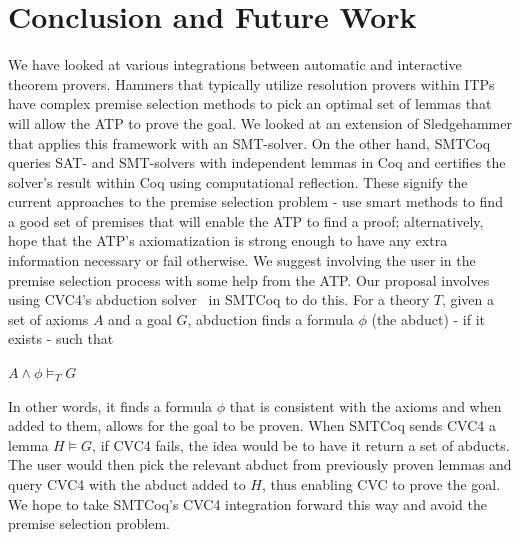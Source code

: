 \documentclass{article}
\begin{document}
\section{Conclusion and Future Work}
\label{sec:conc}
	We have looked at various integrations between 
	automatic and interactive theorem provers.
	Hammers that typically utilize resolution 
	provers within ITPs have complex premise 
	selection methods to pick an optimal set 
	of lemmas that will allow the ATP to prove 
	the goal. We looked at an extension of 
	Sledgehammer that applies this framework 
	with an SMT-solver. On the other hand, 
	SMTCoq queries SAT- and SMT-solvers with 
	independent lemmas in Coq and certifies the 
	solver's result within Coq using computational
	reflection. These signify the current 
	approaches to the premise selection problem - 
	use smart methods to find a good set of 
	premises that will enable the ATP to find a 
	proof; alternatively, hope that the ATP's
	axiomatization is strong enough to have any
	extra information necessary or fail otherwise. 
	We suggest involving the user in the premise 
	selection process with some help from the ATP.
	Our proposal involves using CVC4's abduction
	solver~\cite{DBLP:conf/cade/ReynoldsBLT20} in 
	SMTCoq to do this. For a theory $T$, given a
	set of axioms $A$ and a goal $G$, abduction 
	finds a formula $\phi$ (the abduct) - if it 
	exists - such that 
	\begin{center}
		$A \land \phi \models_{T} G$
	\end{center}
	In other words, it finds a formula $\phi$ that 
	is consistent with the axioms and when added 
	to them, allows for the goal to be proven. 
	When SMTCoq sends CVC4 a lemma $H \models G$, 
	if CVC4 fails, the idea would be to have it 
	return a set of abducts. The user would then 
	pick the relevant abduct from previously 
	proven lemmas and query CVC4 with the abduct 
	added to $H$, thus enabling CVC to prove the 
	goal. We hope to take SMTCoq's CVC4 integration 
	forward this way and avoid the premise 
	selection problem.


\end{document}
